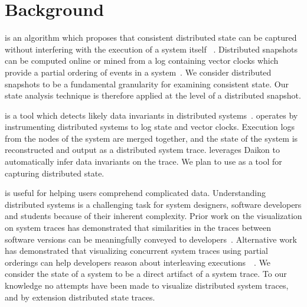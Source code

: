 \section{Background}
\label{sec:background}


 is an algorithm which
proposes that consistent distributed state can be captured without
interfering with the execution of a system itself
~\cite{dist_snapshots_Chandy1985}.  Distributed snapshots can be
computed online or mined from a log containing vector clocks which
provide a partial ordering of events in a
system~\cite{mattern_vector_clocks_1989}. We consider distributed
snapshots to be a fundamental granularity for examining consistent
state. Our state analysis technique is therefore applied at the level
of a distributed snapshot.

\noindent{\textbf{\dinv}} is a tool which detects likely data invariants in distributed
systems~\cite{dinv}. \dinv operates by instrumenting distributed
systems to log state and vector clocks. Execution logs from the nodes
of the system are merged together, and the state of the system is
reconstructed and output as a distributed system trace. \dinv
leverages Daikon to automatically infer data invariants on the trace.
We plan to use \dinv as a tool for capturing distributed state.

 is useful for helping users
comprehend complicated data.  Understanding distributed systems is a
challenging task for system designers, software developers and
students because of their inherent complexity.  Prior work on the
visualization on system traces has demonstrated that similarities in
the traces between software versions can be meaningfully conveyed to
developers~\cite{6613833}. Alternative work has demonstrated that
visualizing concurrent system traces using partial orderings can help
developers reason about interleaving
executions~\cite{6650534}~\cite{7272586}. We consider the state of a
system to be a direct artifact of a system trace. To our knowledge no
attempts have been made to visualize distributed system traces, and by
extension distributed state traces.


